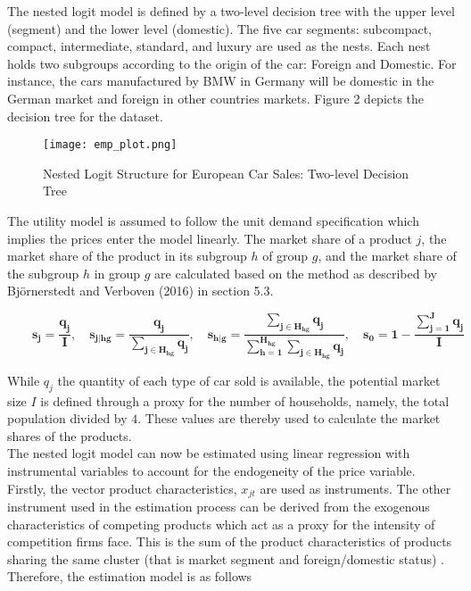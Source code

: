\documentclass[a4paper,11pt]{article}
\begin{document}
    The nested logit model is defined by a two-level decision tree with the upper level (segment) and the lower level (domestic). The five car segments: subcompact, compact, intermediate, standard, and luxury are used as the nests. Each nest holds two subgroups according to the origin of the car: Foreign and Domestic. For instance, the cars manufactured by BMW in Germany will be domestic in the German market and foreign in other countries markets. Figure 2 depicts the decision tree for the dataset.\\

    \begin{figure}[htb]
        \centering
        \texttt{[image: emp\_plot.png]}
        \caption{Nested Logit Structure for European Car Sales: Two-level Decision Tree}
        \label{fig: Emp_Decision Tree}
    \end{figure}

    \newpage
    
    The utility model is assumed to follow the unit demand specification which implies the prices enter the model linearly. The market share of a product $j$, the market share of the product in its subgroup $h$ of group $g$, and the market share of the subgroup $h$ in group $g$ are calculated based on the method as described by Björnerstedt and Verboven (2016) in section 5.3.   


    \begin{equation*}
        \qquad \mathbf{s_{j} = \dfrac{q_{j}}{I}, \quad 
        s_{j|hg} = \dfrac{q_{j}}{\sum_{j \in H_{hg}} q_{j}}, \quad 
        s_{h|g} = \dfrac{\sum_{j \in H_{hg}} q_{j}}{\sum_{h = 1}^{H_{hg}}\sum_{j \in H_{hg}} q_{j}}, \quad 
        s_{0} = 1 - \dfrac{\sum_{j = 1}^{J} q_{j}}{I}} 
    \end{equation*}

    While $q_{j}$ the quantity of each type of car sold is available, the potential market size $I$ is defined through a proxy for the number of households, namely, the total population divided by $4$. These values are thereby used to calculate the market shares of the products.\\

    The nested logit model can now be estimated using linear regression with instrumental variables to account for the endogeneity of the price variable. Firstly, the vector product characteristics, $x_{jt}$ are used as instruments. The other instrument used in the estimation process can be derived from the exogenous characteristics of competing products which act as a proxy for the intensity of competition firms face. This is the sum of the product characteristics of products sharing the same cluster (that is market segment and foreign/domestic status) \cite{Goldberge&Verboven2001}. Therefore, the estimation model is as follows
\end{document}
